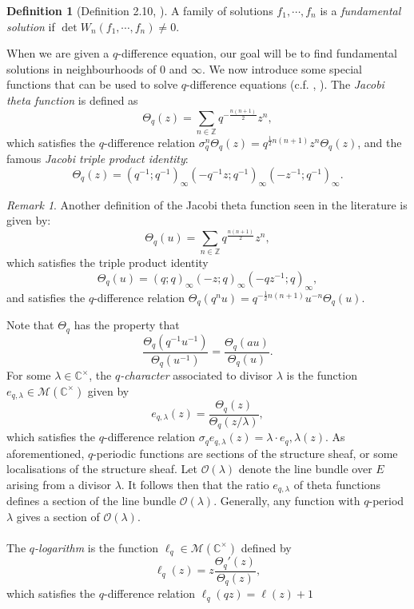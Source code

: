 \documentclass[a4paper]{report}
\theoremstyle{theorem}
\theoremstyle{definition}
\newtheorem{definition}{Definition}
\theoremstyle{remark}
\newtheorem{remark}{Remark}
\theoremstyle{proposition}
\theoremstyle{conjecture}
\theoremstyle{lemma}
\theoremstyle{corollary}
\theoremstyle{exercise}
\theoremstyle{example}
\newcommand{\C}{\mathbb{C}}
\newcommand{\mcal}{\mathcal}
\begin{document}
  \begin{definition}[Definition 2.10, \cite{RW22}]
      A family of solutions $f_1,\cdots,f_n$ is a \emph{fundamental solution}
      if $\det W_n(f_1,\cdots,f_n) \neq 0$.
  \end{definition}
  When we are given a $q$-difference equation, our goal will be to find fundamental
  solutions in neighbourhoods of $0$ and $\infty$.
  We now introduce some special functions that can be used to solve $q$-difference equations (c.f. \cite[\S 1.2.2]{sauloy03}, \cite[\S 2]{RW22}). The \emph{Jacobi theta function} is defined as
  $$\Theta_q(z) = \sum_{n\in \mathbb{Z}} q^{-\frac{n(n+1)}{2}}z^n,$$
  which satisfies the $q$-difference relation $\sigma_q^n\Theta_q(z) = q^{\frac{1}{2}n(n+1)}z^n\Theta_q(z)$, and the famous \emph{Jacobi triple product identity}:
  $$\Theta_q(z) = (q^{-1};q^{-1})_\infty (-q^{-1}z;q^{-1})_\infty (-z^{-1};q^{-1})_\infty.$$ 
  \begin{remark}
      Another definition of the Jacobi theta function seen in the literature is given by:
      $$\Theta_q(u) = \sum_{n \in \mathbb{Z}} q^{\frac{n(n+1)}{2}} z^n,$$ 
      which satisfies the triple product identity 
      $$\Theta_q(u) = (q;q)_\infty (-z;q)_\infty (-qz^{-1};q)_\infty,$$
      and satisfies the $q$-difference relation $\Theta_q(q^nu) = q^{-\frac{1}{2}n(n+1)} u^{-n}\Theta_q(u)$.
  \end{remark}
  Note that $\Theta_q$ has the property that 
  $$\frac{\Theta_q(q^{-1}u^{-1})}{\Theta_q(u^{-1})} = \frac{\Theta_q(au)}{\Theta_q(u)}.$$
  For some $\lambda \in \C^\times$, the \emph{$q$-character} associated
  to divisor $\lambda$ is the function $e_{q,\lambda} \in \mcal{M}(\C^\times)$
  given by
  $$e_{q,\lambda}(z) = \frac{\Theta_q(z)}{\Theta_q(z/\lambda)},$$
  which satisfies the $q$-difference relation $\sigma_qe_{q,\lambda}(z) = \lambda \cdot e_q,\lambda(z)$. 
  As aforementioned, $q$-periodic functions are sections of the structure sheaf, or some localisations of the 
  structure sheaf. Let $\mcal{O}(\lambda)$ denote the line bundle over $E$ arising from a divisor $\lambda$. 
  It follows then that the ratio $e_{q,\lambda}$ of theta functions defines a section of the line bundle 
  $\mcal{O}(\lambda)$. Generally, any function with $q$-period $\lambda$ gives a section of $\mcal{O}(\lambda)$.\\\\
  The \emph{$q$-logarithm} is the function 
  $\ell_q \in \mcal{M}(\C^\times)$ defined by 
  $$\ell_q(z) = z \frac{\Theta_q'(z)}{\Theta_q(z)},$$
  which satisfies the $q$-difference relation $\ell_q(qz) = \ell(z) + 1$
\end{document}
